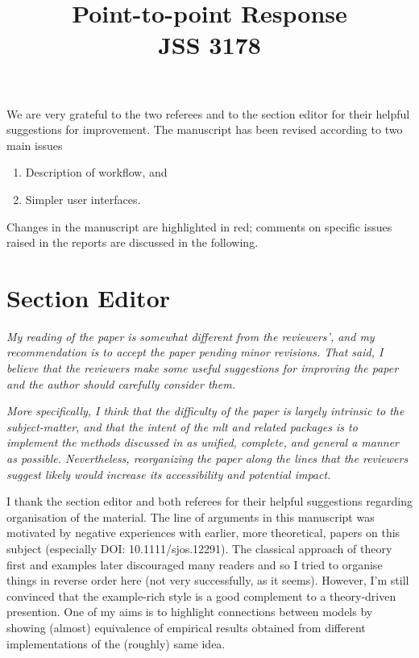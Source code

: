 \documentclass[12pt]{article}
\title{Point-to-point Response \\ JSS 3178}
\author{}
\begin{document}
\maketitle

We are very grateful to the two referees and to the section editor for their
helpful suggestions for improvement. The
manuscript has been revised according to two main issues
\begin{enumerate}
\item Description of workflow, and
\item Simpler user interfaces.
\end{enumerate}
Changes in the manuscript are highlighted in red; comments on specific
issues raised in the reports are discussed in the following.

\section*{Section Editor}

\noindent
\textit{
My reading of the paper is somewhat different from the reviewers', and
my recommendation is to accept the paper pending minor revisions. That
said, I believe that the reviewers make some useful suggestions for
improving the paper and the author should carefully consider them.}

\textit{More specifically, I think that the difficulty of the paper is largely
intrinsic to the subject-matter, and that the intent of the mlt and
related packages is to implement the methods discussed in as unified,
complete, and general a manner as possible. Nevertheless, reorganizing
the paper along the lines that the reviewers suggest likely would
increase its accessibility and potential impact.}

I thank the section editor and both referees for their helpful suggestions
regarding organisation of the material. The line of arguments in this
manuscript was motivated by negative experiences with earlier, more
theoretical, papers on this subject (especially DOI: 10.1111/sjos.12291).
The classical approach of theory first and examples later discouraged many
readers and so I tried to organise things in reverse order here (not very
successfully, as it seems). However, I'm still convinced that the
example-rich style is a good complement to a theory-driven presention. One
of my aims is to highlight connections between models by showing (almost)
equivalence of empirical results obtained from different implementations of
the (roughly) same idea. 
\end{document}
